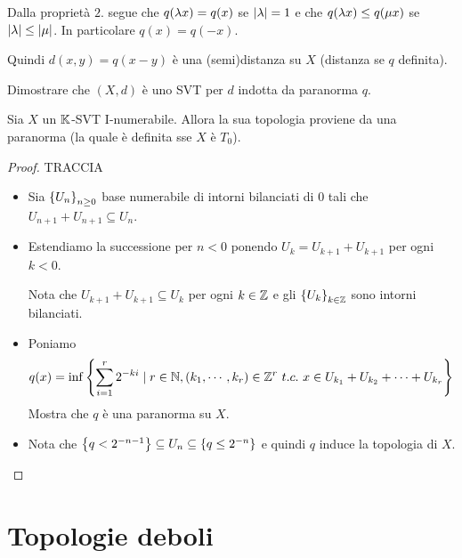 \begin{remark}
Dalla propriet\`a $2.$ segue che $q(\lambda x)=q(x)$ se $\left|{\lambda}\right|=1$ e che $q(\lambda x)\leq q(\mu x)$ se $\left|{\lambda}\right|\leq\left|{\mu}\right|$. In particolare $q(x)=q(-x)$.

Quindi $d(x,y)=q(x-y)$ \`e una (semi)distanza su $X$ (distanza se $q$ definita).
\end{remark}

\begin{exercise}
Dimostrare che $(X,d)$ \`e uno SVT per $d$ indotta da paranorma $q$.
\end{exercise}

\begin{exercise}
Sia $X$ un $\mathbb{K}$-SVT I-numerabile. Allora la sua topologia proviene da una paranorma (la quale \`e definita sse $X$ \`e $T_0$).
\end{exercise}
\begin{proof}
TRACCIA
\begin{itemize}
    \item Sia $\left\{{U_n}\right\}_{n\geq 0}$ base numerabile di intorni bilanciati di $0$ tali che $U_{n+1}+U_{n+1}\subseteq U_n$.
    \item Estendiamo la successione per $n<0$ ponendo $U_k=U_{k+1}+U_{k+1}$ per ogni $k<0$.
    
    Nota che $U_{k+1}+U_{k+1}\subseteq U_k$ per ogni $k\in \mathbb{Z}$ e gli $\left\{{U_k}\right\}_{k\in\mathbb{Z}}$ sono intorni bilanciati. 
    \item Poniamo
    \[q(x)=\inf\left\{{\sum_{i=1}^r2^{-ki}\mid r\in\mathbb{N},(k_1,\cdots, k_r)\in\mathbb{Z}^r\ t.c.\ x\in U_{k_1}+U_{k_2}+\cdots+U_{k_r}}\right\}\]
    Mostra che $q$ \`e una paranorma su $X$.
    \item Nota che $\left\{{q<2^{-n-1}}\right\}\subseteq U_n\subseteq \left\{{q\leq 2^{-n}}\right\}$ e quindi $q$ induce la topologia di $X$.
\end{itemize}
\end{proof}



\section{Topologie deboli}


